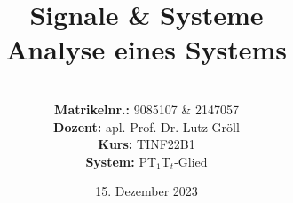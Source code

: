 \documentclass{article}
\title{\textbf{Signale \& Systeme \\ Analyse eines Systems}}
\author{
\vspace{8em} \\
\textbf{Matrikelnr.:} 9085107 \& 2147057 \\
\textbf{Dozent:} apl. Prof. Dr. Lutz Gröll \\
\textbf{Kurs:} TINF22B1 \\
\textbf{System: } PT$_1$T$_t$-Glied
\vspace{8em} 
}
\begin{document}
\date{15. Dezember 2023}

\maketitle


\end{document}
